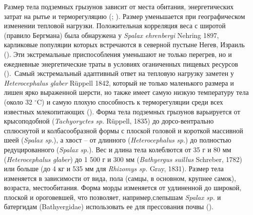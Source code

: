 


Размер тела подземных грызунов зависит от места обитания, энергетических затрат на рытье и терморегуляцию (\cite{Vleck1979}; \cite{McNab1979}). Размер уменьшается при географическом изменении тепловой нагрузки. Положительная корреляция веса с широтой (правило Бергмана) была обнаружена у \textit{Spalax ehrenbergi} Nehring 1897, карликовые популяции которых встречаются в северной пустыне Негев, Израиль (\cite{McNab1966}). Эти экстремальные приспособления уменьшают не только перегрев, но и ежедневные энергетические траты в условиях оганиченных пищевых ресурсов (\cite{McNab1980}). Самый экстремальный адаптивный ответ на тепловую нагрузку заметен у \textit{Heterocephalus glaber} Rüppell 1842, который не только маленького размера и лишен ярко выраженной шерсти, но также имеет самую низкую температуру тела (около 32 $^\circ$C) и самую плохую способность к терморегуляции среди всех известных млекопитающих (\cite{McNab1966}). Форма тела подземных грызунов варьируется от крысоподобной (\textit{Tachyoryctes sp.} Rüppell, 1835) до дорсо-вентрально сплюснутой и колбасообразной формы с плоской головой и короткой массивной шеей (\textit{Spalax sp.}), а хвост -- от длинного (\textit{Heterocephalus sp.}) до полностью редуцированного (\textit{Spalax sp.}). Вес и длина тела колеблются от 35 г и 80 мм (\textit{Heterocephalus glaber}) до 1 500 г и 300 мм (\textit{Bathyergus suillus} Schreber, 1782) или больше (до 4 кг и 535 мм для \textit{Rhizomys sp.} Gray, 1831). Размер тела  изменяется в зависимости от вида, пола (самцы, в основном, крупнее самок), возраста, местообитания. Форма морды изменяется от удлиненной до широкой, плоской и ороговевшей, что позволяет, например,слепышам \textit{Spalax sp.} и батергидам (Bathyergidae) использовать ее для прессования почвы (\cite{Lacey2000}). 

